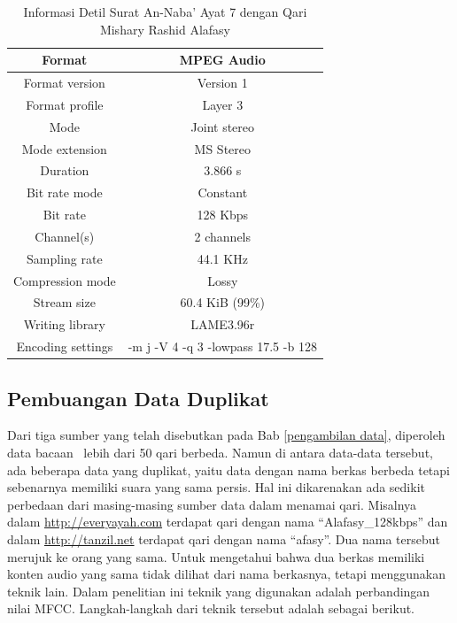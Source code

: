   \begin{table}
    \centering
    \caption{Informasi Detil Surat An-Naba' Ayat 7 dengan Qari Mishary Rashid Alafasy}
    \begin{tabular}{|c|c|}
      \hline
      Format                         & MPEG Audio \\ \hline
      Format version                 & Version 1 \\ \hline
      Format profile                 & Layer 3 \\ \hline
      Mode                           & Joint stereo \\ \hline
      Mode extension                 & MS Stereo \\ \hline
      Duration                       & 3.866 s \\ \hline
      Bit rate mode                  & Constant \\ \hline
      Bit rate                       & 128 Kbps \\ \hline
      Channel(s)                     & 2 channels \\ \hline
      Sampling rate                  & 44.1 KHz \\ \hline
      Compression mode               & Lossy \\ \hline
      Stream size                    & 60.4 KiB (99\%) \\ \hline
      Writing library                & LAME3.96r \\ \hline
      Encoding settings              & -m j -V 4 -q 3 -lowpass 17.5 -b 128 \\ \hline
    \end{tabular}
    \label{table:format berkas 078007 alafasy}
  \end{table}



  \subsection{Pembuangan Data Duplikat}
  Dari tiga sumber yang telah disebutkan pada Bab \ref{pengambilan data}, diperoleh data bacaan \quran~lebih dari 50 qari berbeda. Namun di antara data-data tersebut, ada beberapa data yang duplikat, yaitu data dengan nama berkas berbeda tetapi sebenarnya memiliki suara yang sama persis. Hal ini dikarenakan ada sedikit perbedaan dari masing-masing sumber data dalam menamai qari. Misalnya dalam \url{http://everyayah.com} terdapat qari dengan nama ``Alafasy\_128kbps'' dan dalam \url{http://tanzil.net} terdapat qari dengan nama ``afasy''. Dua nama tersebut merujuk ke orang yang sama. Untuk mengetahui bahwa dua berkas memiliki konten audio yang sama tidak dilihat dari nama berkasnya, tetapi menggunakan teknik lain. Dalam penelitian ini teknik yang digunakan adalah perbandingan nilai MFCC. Langkah-langkah dari teknik tersebut adalah sebagai berikut.

